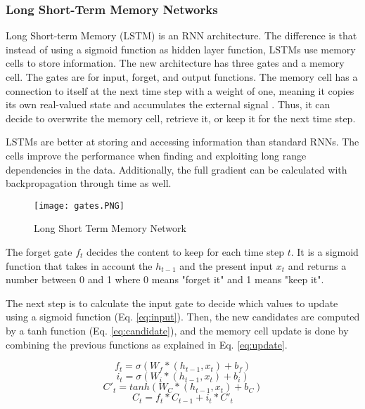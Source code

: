 \subsubsection{Long Short-Term Memory Networks}
Long Short-term Memory (LSTM) is an RNN architecture. The difference is that instead of using a sigmoid function as hidden layer function, LSTMs use memory cells to store information. The new architecture has three gates and a memory cell. The gates are for input, forget, and output functions. The memory cell has a connection to itself at the next time step with a weight of one, meaning it copies its own real-valued state and accumulates the external signal \cite{lecun2015deep}. Thus, it can decide to overwrite the memory cell, retrieve it, or keep it for the next time step\cite{zaremba2014recurrent}. 

LSTMs are better at storing and accessing information than standard RNNs. The cells improve the performance when finding and exploiting long range dependencies in the data. Additionally, the full gradient can be calculated with backpropagation through time as well.\cite{graves2013generating}

\begin{figure}
\label{fig:lstm}
\center
\texttt{[image: gates.PNG]}
\caption{Long Short Term Memory Network}
\end{figure}

The forget gate $f_t$ decides the content to keep for each time step $t$. It is a sigmoid function that takes in account the $h_{t-1}$ and the present input $x_t$ and returns a number between 0 and 1 where 0 means "forget it" and 1 means "keep it". 

The next step is to calculate the input gate to decide which values to update using a sigmoid function (Eq. \ref{eq:input}). Then, the new candidates are computed by a tanh function (Eq. \ref{eq:candidate}), and the memory cell update is done by combining the previous functions as explained in Eq. \ref{eq:update}.

\begin{equation} \label{eq:forget}
f_t=\sigma(W_f*(h_{t-1},x_t)+b_f)
\end{equation}
\begin{equation} \label{eq:input}
i_t=\sigma(W_i*(h_{t-1},x_t)+b_i)
\end{equation}
\begin{equation} \label{eq:candidate}
C'_t=tanh(W_C*(h_{t-1},x_t)+b_C)
\end{equation}
\begin{equation} \label{eq:update}
C_t=f_t*C_{t-1}+i_t*C'_t
\end{equation}

